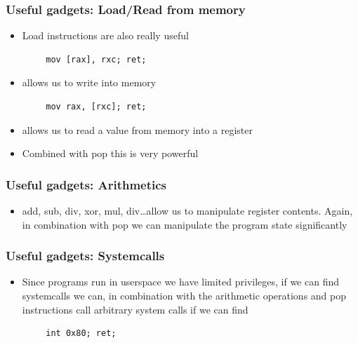 \documentclass[11pt]{beamer}
\begin{document}
\begin{frame}[fragile]
    \frametitle{Useful gadgets: Load/Read from memory}
    \begin{itemize}
        \item Load instructions are also really useful
    \end{itemize}
    \begin{Verbatim}
        mov [rax], rxc; ret;
    \end{Verbatim}
    \begin{itemize}
        \item allows us to write into memory
    \end{itemize}
    \begin{Verbatim}
        mov rax, [rxc]; ret;
    \end{Verbatim}
    \begin{itemize}
        \item allows us to read a value from memory into a register
        \item Combined with pop this is very powerful
    \end{itemize}
\end{frame}
\begin{frame}[fragile]
    \frametitle{Useful gadgets: Arithmetics}
    \begin{itemize}
        \item add, sub, div, xor, mul, div\ldots allow us to manipulate register contents. Again, in combination with pop we can manipulate the program state significantly
    \end{itemize}
\end{frame}
\begin{frame}[fragile]
    \frametitle{Useful gadgets: Systemcalls}
    \begin{itemize}
        \item Since programs run in userspace we have limited privileges, if we can find systemcalls we can, in combination with the arithmetic operations and pop instructions call arbitrary system calls if we can find
    \end{itemize}
    \begin{Verbatim}
        int 0x80; ret;
    \end{Verbatim}
\end{frame}
\end{document}
